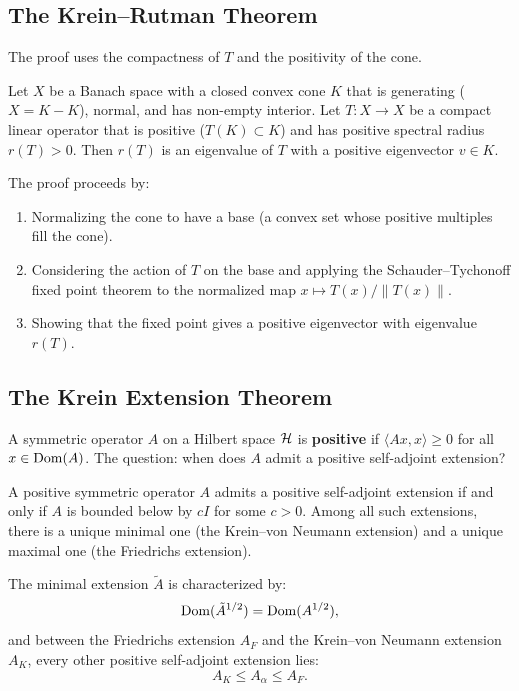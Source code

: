 \subsection{The Krein--Rutman Theorem}

The proof uses the compactness of $T$ and the positivity of the cone.

\begin{theorem}
Let $X$ be a Banach space with a closed convex cone $K$ that is generating ($X = K - K$), normal, and has non-empty interior. Let $T: X \to X$ be a compact linear operator that is positive ($T(K) \subset K$) and has positive spectral radius $r(T) > 0$. Then $r(T)$ is an eigenvalue of $T$ with a positive eigenvector $v \in K$.
\end{theorem}

The proof proceeds by:
\begin{enumerate}
    \item Normalizing the cone to have a base (a convex set whose positive multiples fill the cone).
    \item Considering the action of $T$ on the base and applying the Schauder--Tychonoff fixed point theorem to the normalized map $x \mapsto T(x)/\|T(x)\|$.
    \item Showing that the fixed point gives a positive eigenvector with eigenvalue $r(T)$.
\end{enumerate}

\subsection{The Krein Extension Theorem}

A symmetric operator $A$ on a Hilbert space $\mathcal{H}$ is \textbf{positive} if $\langle Ax, x\rangle \geq 0$ for all $x \in \operatorname{Dom}(A)$. The question: when does $A$ admit a positive self-adjoint extension?

\begin{theorem}
A positive symmetric operator $A$ admits a positive self-adjoint extension if and only if $A$ is bounded below by $cI$ for some $c > 0$. Among all such extensions, there is a unique minimal one (the Krein--von Neumann extension) and a unique maximal one (the Friedrichs extension).
\end{theorem}

The minimal extension $\tilde A$ is characterized by:
\[
\operatorname{Dom}(\tilde A^{1/2}) = \operatorname{Dom}(A^{1/2}),
\]
and between the Friedrichs extension $A_F$ and the Krein--von Neumann extension $A_K$, every other positive self-adjoint extension lies:
\[
A_K \leq A_\alpha \leq A_F.
\]

